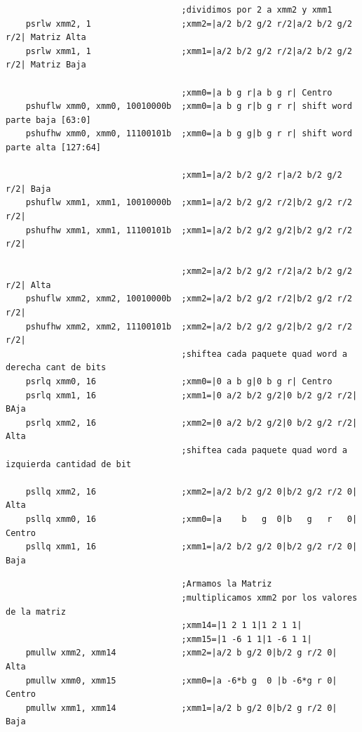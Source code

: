 \begin{codesnippet}
\begin{verbatim}    
                                   ;dividimos por 2 a xmm2 y xmm1
    psrlw xmm2, 1                  ;xmm2=|a/2 b/2 g/2 r/2|a/2 b/2 g/2 r/2| Matriz Alta
    psrlw xmm1, 1                  ;xmm1=|a/2 b/2 g/2 r/2|a/2 b/2 g/2 r/2| Matriz Baja

                                   ;xmm0=|a b g r|a b g r| Centro
    pshuflw xmm0, xmm0, 10010000b  ;xmm0=|a b g r|b g r r| shift word parte baja [63:0]
    pshufhw xmm0, xmm0, 11100101b  ;xmm0=|a b g g|b g r r| shift word parte alta [127:64]

                                   ;xmm1=|a/2 b/2 g/2 r|a/2 b/2 g/2 r/2| Baja
    pshuflw xmm1, xmm1, 10010000b  ;xmm1=|a/2 b/2 g/2 r/2|b/2 g/2 r/2 r/2| 
    pshufhw xmm1, xmm1, 11100101b  ;xmm1=|a/2 b/2 g/2 g/2|b/2 g/2 r/2 r/2|

                                   ;xmm2=|a/2 b/2 g/2 r/2|a/2 b/2 g/2 r/2| Alta
    pshuflw xmm2, xmm2, 10010000b  ;xmm2=|a/2 b/2 g/2 r/2|b/2 g/2 r/2 r/2|
    pshufhw xmm2, xmm2, 11100101b  ;xmm2=|a/2 b/2 g/2 g/2|b/2 g/2 r/2 r/2|
                                   ;shiftea cada paquete quad word a derecha cant de bits
    psrlq xmm0, 16                 ;xmm0=|0 a b g|0 b g r| Centro
    psrlq xmm1, 16                 ;xmm1=|0 a/2 b/2 g/2|0 b/2 g/2 r/2| BAja
    psrlq xmm2, 16                 ;xmm2=|0 a/2 b/2 g/2|0 b/2 g/2 r/2| Alta
                                   ;shiftea cada paquete quad word a izquierda cantidad de bit

    psllq xmm2, 16                 ;xmm2=|a/2 b/2 g/2 0|b/2 g/2 r/2 0| Alta
    psllq xmm0, 16                 ;xmm0=|a    b   g  0|b   g   r   0| Centro
    psllq xmm1, 16                 ;xmm1=|a/2 b/2 g/2 0|b/2 g/2 r/2 0| Baja
\end{verbatim}
\end{codesnippet}

\begin{codesnippet}
\begin{verbatim}    
								   ;Armamos la Matriz
                                   ;multiplicamos xmm2 por los valores de la matriz
                                   ;xmm14=|1 2 1 1|1 2 1 1|
                                   ;xmm15=|1 -6 1 1|1 -6 1 1|
    pmullw xmm2, xmm14             ;xmm2=|a/2 b g/2 0|b/2 g r/2 0| Alta
    pmullw xmm0, xmm15			   ;xmm0=|a -6*b g  0 |b -6*g r 0| Centro
    pmullw xmm1, xmm14			   ;xmm1=|a/2 b g/2 0|b/2 g r/2 0| Baja
\end{verbatim}
\end{codesnippet}

